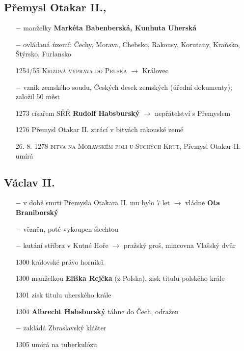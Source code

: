 \documentclass{article}
\begin{document}
\subsection*{Přemysl Otakar II., }
\begin{itemize}
    \vspace{-0.5em}
    \setlength\itemsep{0.15em}
    \item[$-$] manželky \textbf{Markéta Babenberská, Kunhuta Uherská}
    \item[$-$] ovládaná území: Čechy, Morava, Chebsko, Rakousy, Korutany, Kraňsko, Štýrsko, Furlansko
    \item[1254/55] \textsc{Křížová výprava do Pruska} $\rightarrow$ Královec
    \item[$-$] vznik zemského soudu, Českých desek zemských (úřední dokumenty); založil 50 měst
    \item[1273] císařem SŘŘ \textbf{Rudolf Habsburský} $\rightarrow$ nepřátelství s Přemyslem
    \item[1276] Přemysl Otakar II. ztrácí v bitvách rakouské země
    \item[26. 8. 1278] \textsc{bitva na Moravském poli u Suchých Krut}, Přemysl Otakar II. umírá
\end{itemize}

\subsection*{Václav II.}
\begin{itemize}
    \vspace{-0.5em}
    \setlength\itemsep{0.15em}
    \item[$-$] v době smrti Přemysla Otakara II. mu bylo 7 let $\rightarrow$ vládne \textbf{Ota Braniborský}
    \item[$-$] vězněn, poté vykoupen šlechtou
    \item[$-$] kutání stříbra v Kutné Hoře $\rightarrow$  pražský groš, mincovna Vlašský dvůr
    \item[1300] královské právo horníků
    \item[1300] manželkou \textbf{Eliška Rejčka} (z Polska), zisk titulu polského krále
    \item[1301] zisk titulu uherského krále
    \item[1304] \textbf{Albrecht Habsburský} táhne do Čech, odražen
    \item[$-$] zakládá Zbraslavský klášter
    \item[1305] umírá na tuberkulózu
\end{itemize}
\end{document}
